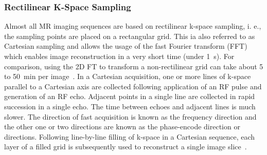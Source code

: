 \documentclass[english,version-2022-01]{uzl-thesis} %
\begin{document}
\subsubsection{Rectilinear K-Space Sampling}
Almost all MR imaging sequences 
are based on rectilinear k-space sampling, i. e., the sampling points 
are placed on a rectangular grid. This 
ia also referred to as Cartesian sampling and 
allows the usage of the fast Fourier transform (FFT) 
which enables 
image reconstruction in 
a very short time (under 1~s). 
For comparison, using
the 
2D FT 
to transform a non-rectilinear grid can take about
5 to 50~min per image~\cite{SamplingStrategies}.
In a Cartesian acquisition, one or more lines of k-space parallel to a Cartesian axis are collected following application of an RF pulse and generation of an RF echo. Adjacent points in a single line are collected in rapid succession in a single echo. The time between echoes and adjacent lines is much slower. The direction of fast acquisition is known as the frequency direction and the other one or two directions are known as the phase-encode direction or directions. Following line-by-line filling of k-space in a Cartesian sequence, each layer of a filled grid is subsequently used to reconstruct a single image slice~\cite{Bardo2021}.
\end{document}
